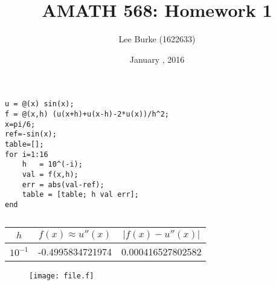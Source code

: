 \documentclass{article}
\title{AMATH 568: Homework 1}
\date{January \nth{13}, 2016}
\author{Lee Burke (1622633)}
\begin{document}
\maketitle
\section{}
\subsection{}

\begin{lstlisting}
u = @(x) sin(x);
f = @(x,h) (u(x+h)+u(x-h)-2*u(x))/h^2;
x=pi/6;
ref=-sin(x);
table=[];
for i=1:16
    h   = 10^(-i);
    val = f(x,h);
    err = abs(val-ref);
    table = [table; h val err];
end
\end{lstlisting}

\begin{table}[H]
	\centering
	\caption{}
	\begin{tabular}{c|c|c}
	$h$ & $f(x)\approx u''(x)$ & $|f(x)-u''(x)|$ \\
	\hline
	$10^{-1}$ & -0.4995834721974 & 0.000416527802582 \\
	\end{tabular}
\end{table}

\begin{figure}
	\centering
	\texttt{[image: file.f]}
	\caption{}
\end{figure}
\end{document}
